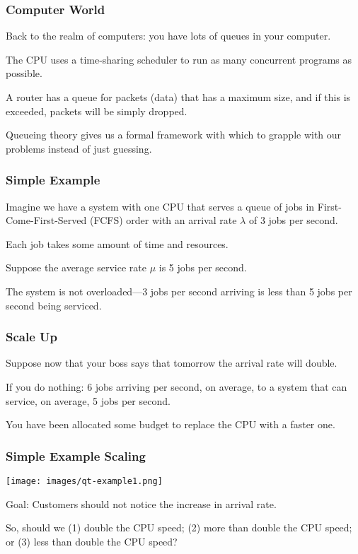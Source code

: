 \begin{frame}
\frametitle{Computer World}

Back to the realm of computers: you have lots of queues in your computer. 

The CPU uses a time-sharing scheduler to run as many concurrent programs as possible. 

A router has a queue for packets (data) that has a maximum size, and if this is exceeded, packets will be simply dropped. 

Queueing theory gives us a formal framework with which to grapple with our problems instead of just guessing.


\end{frame}



\begin{frame}
\frametitle{Simple Example}

Imagine we have a system with one CPU that serves a queue of jobs in First-Come-First-Served (FCFS) order with an arrival rate $\lambda$ of 3 jobs per second. 

Each job takes some amount of time and resources. 

Suppose the average service rate $\mu$ is 5 jobs per second. 

The system is not overloaded---3 jobs per second arriving is less than 5 jobs per second being serviced. 

\end{frame}



\begin{frame}
\frametitle{Scale Up}

Suppose now that your boss says that tomorrow the arrival rate will double.

If you do nothing: 6 jobs arriving per second, on average, to a system that can service, on average, 5 jobs per second. 

You have been allocated some budget to replace the CPU with a faster one.

\end{frame}



\begin{frame}
\frametitle{Simple Example Scaling}

\begin{center}
	\texttt{[image: images/qt-example1.png]}
\end{center}

Goal: Customers should not notice the increase in arrival rate. 

So, should we (1) double the CPU speed; (2) more than double the CPU speed; or (3) less than double the CPU speed?

\end{frame}



